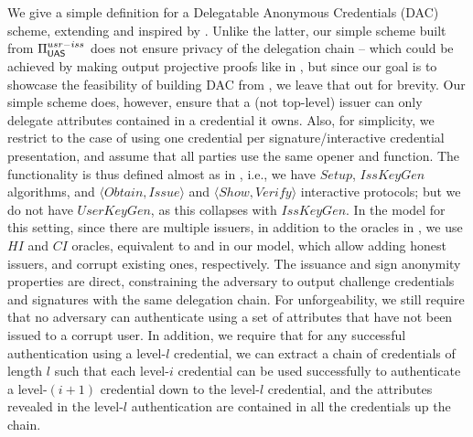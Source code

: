 We give a simple definition for a Delegatable Anonymous Credentials (DAC)
scheme, extending \cite{fhs19} and inspired by \cite{bcc+09}. Unlike the latter,
our simple scheme built from $\Pi_{\mathsf{UAS}}^{usr-iss}$ does not ensure privacy of the
delegation chain -- which could be achieved by making \feval output projective
proofs like in \cite{bcc+09}, but since our goal is to showcase the feasibility
of building DAC from \UAS, we leave that out for brevity. Our simple scheme
does, however, ensure that a (not top-level) issuer can only delegate attributes
contained in a credential it owns. Also, for simplicity, we restrict to the case
of using one credential per signature/interactive credential presentation, and
assume that all parties use the same opener and \finsp function.
%
The functionality is thus defined almost as in ,
i.e., we have $Setup$, $IssKeyGen$ algorithms, and $\langle Obtain,Issue\rangle$
and $\langle Show,Verify \rangle$ interactive protocols; but we do not have
$UserKeyGen$, as this collapses with $IssKeyGen$.
%
In the model for this setting, since there are multiple issuers, in addition
to the oracles in , we use $HI$ and $CI$ oracles,
equivalent to \IGEN and \ICORR in our \UAS model, which allow adding honest
issuers, and corrupt existing ones, respectively. The issuance and sign
anonymity properties are direct, constraining the adversary to output challenge
credentials and signatures with the same delegation chain. For unforgeability,
we still require that no adversary can authenticate using a set of attributes
that have not been issued to a corrupt user. In addition, we require that for
any successful authentication using a level-$l$ credential, we
can extract a chain of credentials of length $l$ such that each level-$i$
credential can be used successfully to authenticate a level-$(i+1)$ credential
down to the level-$l$ credential, and the attributes revealed in the
level-$l$ authentication are contained in all the credentials up the chain.

